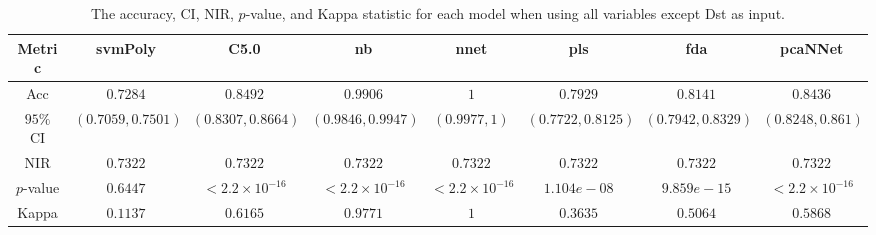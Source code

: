 \begin{table}[!ht]
	\centering
	\begin{tabular}{|c|c|c|c|c|c|c|c|}
		\hline
		Metric & svmPoly & C5.0 & nb & nnet & pls & fda & pcaNNet \\ \hline
		Acc & $0.7284$ & $0.8492$ & $0.9906$ & $1$ & $0.7929$ & $0.8141$ & $0.8436$ \\ \hline
		$95\%$ CI & $(0.7059, 0.7501)$ & $(0.8307, 0.8664)$ & $(0.9846, 0.9947)$ & $(0.9977, 1)$ & $(0.7722, 0.8125)$ & $(0.7942, 0.8329)$ & $(0.8248, 0.861)$ \\ \hline
		NIR & $0.7322$ & $0.7322$ & $0.7322$ & $0.7322$ & $0.7322$ & $0.7322$ & $0.7322$ \\ \hline
		$p$-value & $0.6447$ & $< 2.2 \times {10}^{-16}$ & $< 2.2 \times {10}^{-16}$ & $< 2.2 \times {10}^{-16}$ & $1.104e-08$ & $9.859e-15$ & $< 2.2 \times {10}^{-16}$ \\ \hline
		Kappa & $0.1137$ & $0.6165$ & $0.9771$ & $1$ & $0.3635$ & $0.5064$ & $0.5868$ \\ \hline
	\end{tabular}
	\caption{The accuracy, CI, NIR, $p$-value, and Kappa statistic for each model when using all variables except Dst as input.}
	\label{tab:stats:noDst}
\end{table}
